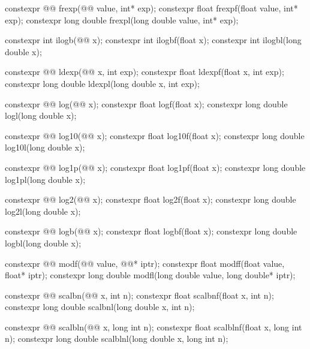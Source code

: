 \begin{codeblock}
{  constexpr @@ frexp(@@ value, int* exp);
  constexpr float               frexpf(float value, int* exp);
  constexpr long double         frexpl(long double value, int* exp);

  constexpr int ilogb(@@ x);
  constexpr int ilogbf(float x);
  constexpr int ilogbl(long double x);

  constexpr @@ ldexp(@@ x, int exp);
  constexpr float               ldexpf(float x, int exp);
  constexpr long double         ldexpl(long double x, int exp);

  constexpr @@ log(@@ x);
  constexpr float               logf(float x);
  constexpr long double         logl(long double x);

  constexpr @@ log10(@@ x);
  constexpr float               log10f(float x);
  constexpr long double         log10l(long double x);

  constexpr @@ log1p(@@ x);
  constexpr float               log1pf(float x);
  constexpr long double         log1pl(long double x);

  constexpr @@ log2(@@ x);
  constexpr float               log2f(float x);
  constexpr long double         log2l(long double x);

  constexpr @@ logb(@@ x);
  constexpr float               logbf(float x);
  constexpr long double         logbl(long double x);

  constexpr @@ modf(@@ value, @@* iptr);
  constexpr float               modff(float value, float* iptr);
  constexpr long double         modfl(long double value, long double* iptr);

  constexpr @@ scalbn(@@ x, int n);
  constexpr float               scalbnf(float x, int n);
  constexpr long double         scalbnl(long double x, int n);

  constexpr @@ scalbln(@@ x, long int n);
  constexpr float               scalblnf(float x, long int n);
  constexpr long double         scalblnl(long double x, long int n);

}
\end{codeblock}

